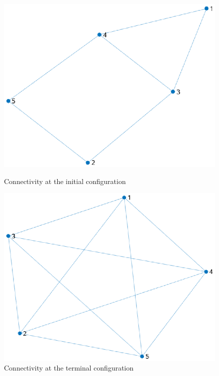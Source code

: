 \documentclass[a4paper,10pt, english]{article}
\begin{document}
\begin{figure}[ht]
  \begin{minipage}[b]{0.5\textwidth}
    \includegraphics[width=\textwidth]{figures/a5_D_cg0.eps}
    \caption{Connectivity at the initial configuration}
    \label{g0}
  \end{minipage}
  \hfill
  \begin{minipage}[b]{0.5\textwidth}
    \includegraphics[width=\textwidth]{figures/a5_D_cgT.eps}
    \caption{Connectivity at the terminal configuration}
    \label{gT}
  \end{minipage}
\end{figure}
  
\end{document}
